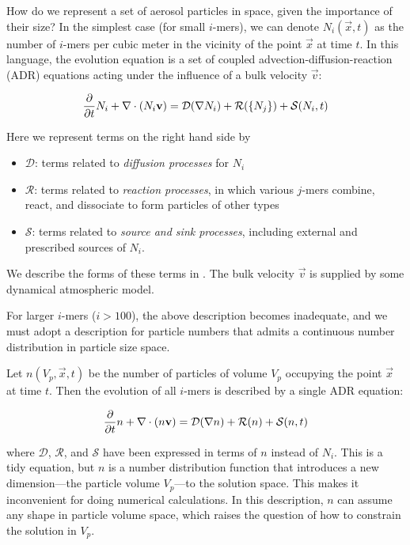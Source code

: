 How do we represent a set of aerosol particles in space, given the importance
of their size? In the simplest case (for small $i$-mers), we can denote
$N_i(\vec{x}, t)$ as the number of $i$-mers per cubic meter in the vicinity of
the point $\vec{x}$ at time $t$. In this language, the evolution equation is a
set of coupled advection-diffusion-reaction (ADR) equations acting under the
influence of a bulk velocity $\vec{v}$:

\begin{equation}\labeleq{small_imer_dNdt}
  \ddt{N_i} + \div{(N_i\vec{v})} = \mathcal{D}(\nabla N_i) +
                                   \mathcal{R}(\{N_j\}) +
                                   \mathcal{S}(N_i, t)
\end{equation}

Here we represent terms on the right hand side by

\begin{itemize}
  \item $\mathcal{D}$: terms related to {\it diffusion processes} for $N_i$
  \item $\mathcal{R}$: terms related to {\it reaction processes}, in which
        various $j$-mers combine, react, and dissociate to form particles of
        other types
  \item $\mathcal{S}$: terms related to {\it source and sink processes},
        including external and prescribed sources of $N_i$.
\end{itemize}

We describe the forms of these terms in . The bulk
velocity $\vec{v}$ is supplied by some dynamical atmospheric model.

For larger $i$-mers ($i > 100$), the above description becomes inadequate, and
we must adopt a description for particle numbers that admits a continuous
number distribution in particle size space.

Let $n(V_p, \vec{x}, t)$ be the number of particles of volume $V_p$ occupying
the point $\vec{x}$ at time $t$. Then the evolution of all $i$-mers is described
by a single ADR equation:

\begin{equation}\labeleq{continuous_dndt}
  \ddt{n} + \div{(n\vec{v})} = \mathcal{D}(\nabla n) +
                               \mathcal{R}(n) +
                               \mathcal{S}(n, t)
\end{equation}

where $\mathcal{D}$, $\mathcal{R}$, and $\mathcal{S}$ have been expressed
in terms of $n$ instead of $N_i$. This is a tidy equation, but $n$ is a
number distribution function that introduces a new dimension---the particle volume
$V_p$---to the solution space. This makes it inconvenient for doing numerical
calculations. In this description, $n$ can assume any shape in particle volume
space, which raises the question of how to constrain the solution in $V_p$.

